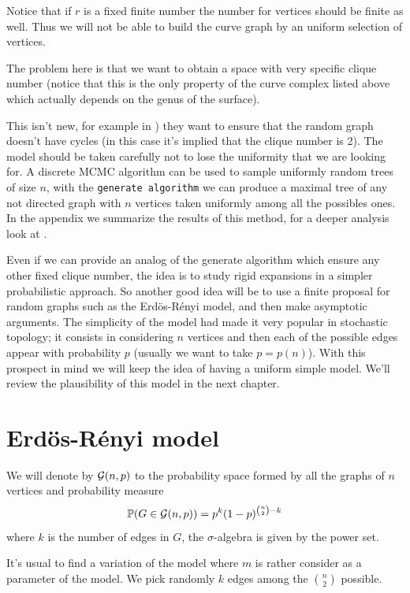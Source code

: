Notice that if $r$ is a fixed finite number the number for vertices should be finite as well. Thus we will not be able to build the curve graph by an uniform selection of vertices. 

The problem here is that we want to obtain a space with very specific clique number (notice that this is the only property of the curve complex listed above which actually depends on the genus of the surface). 

This isn't new, for example in \cite{Alcazar15}) they want to ensure that the random graph doesn't have cycles (in this case it's implied that the clique number is 2). The model should be taken carefully not to lose the uniformity that we are looking for. A discrete MCMC algorithm can be used to sample uniformly random trees of size $n$, with the \texttt{generate algorithm} we can produce a maximal tree of any not directed graph with $n$ vertices taken uniformly among all the possibles ones. In the appendix we summarize the results of this method, for a deeper analysis look at \cite{Broder89}.

Even if we can provide an analog of the generate algorithm which ensure any other fixed clique number, the idea is to study rigid expansions in a simpler probabilistic approach. So another good idea will be to use a finite proposal for random graphs such as the Erdös-Rényi model, and then make asymptotic arguments. The simplicity of the model had made it very popular in stochastic topology; it consists in considering $n$ vertices and then each of the possible edges appear with probability $p$ (usually we want to take $p=p(n)$). With this prospect in mind we will keep the idea of having a uniform simple model. We'll review the plausibility of this model in the next chapter.

\section{Erdös-Rényi model}

\begin{defini}
We will denote by $\mathcal{G}(n,p)$ to the probability space formed by all the graphs of $n$ vertices and probability measure 
$$ \mathbb{P}(G\in \mathcal{G}(n,p)) = p^{k} (1-p)^{\binom{n}{2}-k} $$
where $k$ is the number of edges in $G$, the $\sigma$-algebra is given by the power set.
\end{defini}

It's usual to find a variation of the model where $m$ is rather consider as a parameter of the model. We pick randomly $k$ edges among the $\binom{n}{2}$ possible. 

